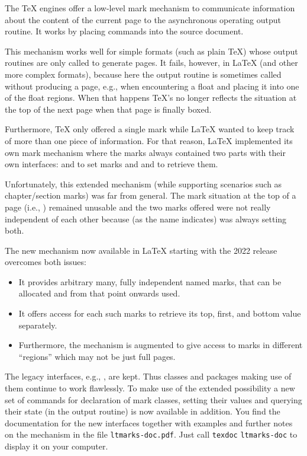 \documentclass{ltnews}
\begin{document}
The \TeX{} engines offer a low-level mark mechanism to
communicate information about the content of the current page to
the asynchronous operating output routine. It works by placing
 commands into the source document.

This mechanism works well for simple formats (such as plain \TeX)
whose output routines are only called to generate pages. It
fails, however, in \LaTeX{} (and other more complex formats),
because here the output routine is sometimes called without
producing a page, e.g., when encountering a float and placing it
into one of the float regions.
%
When that happens \TeX{}'s   no
longer reflects the situation at the top of the next page when that
page is finally boxed.

Furthermore, \TeX{} only offered a single mark while \LaTeX{} wanted to
keep track of more than one piece of information.  For that reason,
\LaTeX{} implemented its own mark mechanism where the marks always
contained two parts with their own interfaces:  and
 to set marks and  and  to
retrieve them.

Unfortunately, this extended mechanism (while supporting scenarios such
as chapter/section marks) was far from general. The mark
situation at the top of a page (i.e., ) remained
unusable and the two marks offered were not really independent of
each other because  (as the name indicates) was
always setting both.


The new mechanism now available in \LaTeX{} starting with the 2022
release overcomes both issues:
\begin{itemize}
\item
  It provides arbitrary many, fully independent named marks, that
  can be allocated and from that point onwards used.
\item
  It offers access for each such marks to retrieve its top,
  first, and bottom value separately.
\item
  Furthermore, the mechanism is augmented to give access to marks
  in different ``regions'' which may not be just full pages.
\end{itemize}
The legacy interfaces, e.g., , are kept. Thus classes and
packages making use of them continue to work flawlessly. To make use
of the extended possibility a new set of commands for declaration of
mark classes, setting their values and querying their state (in the
output routine) is now available in addition.
%
You find the documentation for the new interfaces together with
examples and further notes on the mechanism in the file
\texttt{ltmarks-doc.pdf}. Just call \texttt{texdoc}
\texttt{ltmarks-doc} to display it on your computer.
\end{document}
